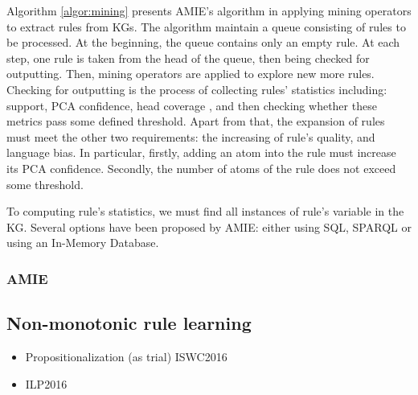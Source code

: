 Algorithm \ref{algor:mining} presents AMIE's algorithm in applying mining operators to extract rules from KGs. The algorithm maintain a queue consisting of rules to be processed. At the beginning, the queue contains only an empty rule. At each step, one rule is taken from the head of the queue, then being checked for outputting. Then, mining operators are applied to explore new more rules.
Checking for outputting is the process of collecting rules' statistics including: support, PCA confidence, head coverage \cite{}, and then checking whether these metrics pass some defined threshold. Apart from that, the expansion of rules must meet the other two requirements: the increasing of rule's quality, and language bias. In particular, firstly, adding an atom into the rule must increase its PCA confidence. Secondly, the number of atoms of the rule does not exceed some threshold.

To computing rule's statistics, we must find all instances of rule's variable in the KG. Several options have been proposed by AMIE: either using SQL, SPARQL \cite{} or using an In-Memory Database.

\subsubsection{AMIE}
\subsection{Non-monotonic rule learning}
\begin{itemize}
\item Propositionalization (as trial) ISWC2016
\item ILP2016

\end{itemize}


